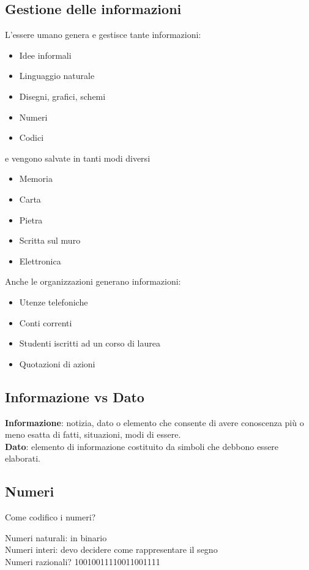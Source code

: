 \documentclass[12pt,a4paper]{article}
\begin{document}
\subsection{Gestione delle informazioni}
L'essere umano genera e gestisce tante informazioni:
\begin{itemize}
\item Idee informali
\item Linguaggio naturale
\item Disegni, grafici, schemi
\item Numeri
\item Codici
\end{itemize}
e vengono salvate in tanti modi diversi
\begin{itemize}
\item Memoria
\item Carta
\item Pietra
\item Scritta sul muro
\item Elettronica
\end{itemize}

\SmallSep \noindent
Anche le organizzazioni generano informazioni:
\begin{itemize}
\item Utenze telefoniche
\item Conti correnti
\item Studenti iscritti ad un corso di laurea
\item Quotazioni di azioni
\end{itemize}

\subsection{Informazione vs Dato}
\textbf{Informazione}: notizia, dato o elemento che consente di avere conoscenza più o meno esatta di fatti, situazioni, modi di essere.\\
\textbf{Dato}: elemento di informazione costituito da simboli che debbono essere elaborati.\\

\subsection{Numeri}
\begin{center}Come codifico i numeri?\end{center}
Numeri naturali: in binario\\
Numeri interi: devo decidere come rappresentare il segno\\
Numeri razionali? 10010011110011001111
\end{document}
